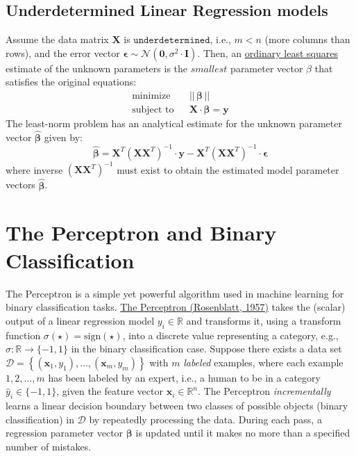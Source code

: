 \documentclass{article}[12pt]
\begin{document}
\subsection{Underdetermined Linear Regression models}
Assume the data matrix $\mathbf{X}$ is $\texttt{underdetermined}$, i.e., $m < n$ (more columns than rows), and 
the error vector $\mathbf{\epsilon}\sim\mathcal{N}(\mathbf{0},\sigma^{2}\cdot\mathbf{I})$.
Then, an \href{https://en.wikipedia.org/wiki/Ordinary_least_squares}{ordinary least squares} estimate of the unknown parameters is the $\textit{smallest}$ parameter vector $\beta$ that satisfies the original equations:
\begin{eqnarray*}
\text{minimize}~& & ||\,\mathbf{\beta}\,|| \\
\text{subject to} & & \mathbf{X}\cdot\mathbf{\beta} = \mathbf{y}
\end{eqnarray*}
The least-norm problem has an analytical estimate for the unknown parameter vector $\hat{\mathbf{\beta}}$ given by:
\begin{equation*}
\hat{\mathbf{\beta}} =\mathbf{X}^{T}\left(\mathbf{X}\mathbf{X}^{T}\right)^{-1}\cdot\mathbf{y} - \mathbf{X}^{T}\left(\mathbf{X}\mathbf{X}^{T}\right)^{-1}\cdot\mathbf{\epsilon}
\end{equation*}
where inverse $\left(\mathbf{X}\mathbf{X}^{T}\right)^{-1}$ must exist to obtain the estimated model parameter vectors $\hat{\mathbf{\beta}}$.

\section{The Perceptron and Binary Classification}
The Perceptron \cite{Perceptron1960} is a simple yet powerful algorithm used in machine learning for binary classification tasks.
\href{https://en.wikipedia.org/wiki/Perceptron}{The Perceptron (Rosenblatt, 1957)} takes the (scalar) output of a linear regression model $y_{i}\in\mathbb{R}$ and transforms it, using a transform function $\sigma(\star) = \text{sign}(\star)$, into a discrete value representing a category, e.g., $\sigma:\mathbb{R}\rightarrow\{-1,1\}$ in the binary classification case. 
Suppose there exists a data set $\mathcal{D} = \left\{(\mathbf{x}_{1},y_{1}),\dotsc,(\mathbf{x}_{m},y_{m})\right\}$ with $m$ \textit{labeled} examples, where each example $1,2,\dots,m$ has been labeled by an expert, i.e., a human to be in a category $\hat{y}_{i}\in\{-1,1\}$, given the feature vector $\mathbf{x}_{i}\in\mathbb{R}^{n}$. 
The Perceptron \textit{incrementally} learns a linear decision boundary between two classes of possible objects (binary classification) in $\mathcal{D}$ by repeatedly processing the data. 
During each pass, a regression parameter vector $\mathbf{\beta}$ is updated until it makes no more than a specified number of mistakes. 
\end{document}
